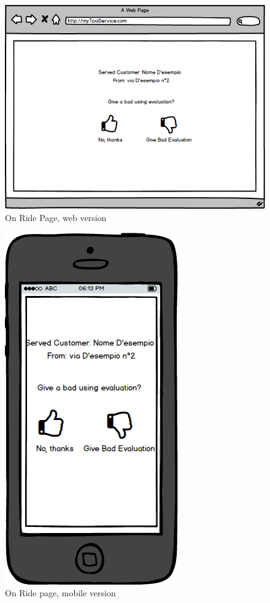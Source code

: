 \documentclass{report}
\begin{document}
				\begin{figure}[H]
					\centering
					\includegraphics[scale=0.5]{IMG/UserInterfaces/onRidePage.png}
					\caption{On Ride Page, web version}\label{visina8}
				\end{figure}
				\begin{figure}[H]
					\centering
					\includegraphics[scale=0.4]{IMG/UserInterfaces/onRidePage_m.png}
					\caption{On Ride page, mobile version}\label{visina8}
				\end{figure}
				
\end{document}
